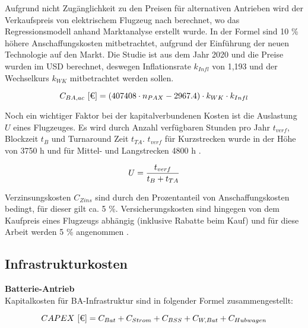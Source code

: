 Aufgrund nicht Zugänglichkeit zu den Preisen für alternativen Antrieben wird der Verkaufspreis von elektrischem Flugzeug nach 
\cite{monjon2020conceptual} berechnet, 
wo das Regressionsmodell anhand Marktanalyse erstellt wurde. In der Formel sind 10 \% höhere Anschaffungskosten mitbetrachtet, 
aufgrund der Einführung der neuen Technologie auf den Markt.
Die Studie ist aus dem Jahr 2020 und die Preise wurden im USD berechnet, deswegen Inflationsrate $k_{Infl}$ von 1,193 und
der Wechselkurs $k_{WK}$ mitbetrachtet werden sollen.

\begin{equation}
   {C_{BA,ac} ~[\text{€}]} = (407408 \cdot n_{PAX} - 2967.4) \cdot k_{WK} \cdot {k_{Infl}}\\
   \label{price BA}
\end{equation}

Noch ein wichtiger Faktor bei der kapitalverbundenen Kosten ist die Auslastung $U$ eines Flugzeuges. Es wird durch Anzahl 
verfügbaren Stunden pro Jahr $t_{verf}$, Blockzeit $t_B$ und Turnaround Zeit $t_{TA}$. $t_{verf}$ für Kurzstrecken wurde 
in der Höhe von 3750 h und für Mittel- und Langstrecken 4800 h \cite{scholz_design_evaluation_doc}.

\begin{equation}
   U = \frac{t_{verf}}{t_B + t_{TA}} \\
   \label{utilisation}
\end{equation}

Verzinsungskosten $C_{Zins}$ sind durch den Prozentanteil von Anschaffungskosten bedingt, für dieser gilt ca. 5 \%. Versicherungskosten sind 
hingegen von dem Kaufpreis eines Flugzeugs abhängig (inklusive Rabatte beim Kauf) und für diese Arbeit werden 5 \% angenommen 
\cite{scholz_design_evaluation_doc}.


\subsection{Infrastrukturkosten}

\textbf{Batterie-Antrieb}\\
Kapitalkosten für BA-Infrastruktur sind in folgender Formel zusammengestellt:

\begin{equation}
     {CAPEX ~[\text{€}]} = C_{Bat} + C_{Strom} + C_{BSS} + C_{W,Bat} + C_{Hubwagen}\\
     \label{BA_Infrastruktur}
  \end{equation}


